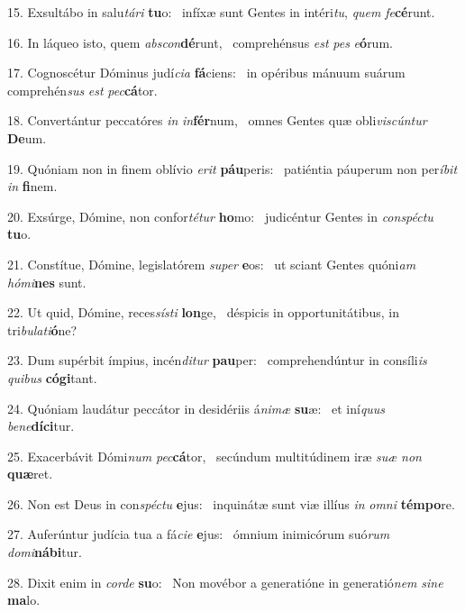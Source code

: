 15. Exsultábo in salu\textit{tá}\textit{ri} \textbf{tu}o: \ast\  infíxæ sunt Gentes in intéri\textit{tu}, \textit{quem} \textit{fe}\textbf{cé}runt.\

16. In láqueo isto, quem \textit{abs}\textit{con}\textbf{dé}runt, \ast\  comprehénsus \textit{est} \textit{pes} \textit{e}\textbf{ó}rum.\

17. Cognoscétur Dóminus judí\textit{ci}\textit{a} \textbf{fá}ciens: \ast\  in opéribus mánuum suárum comprehén\textit{sus} \textit{est} \textit{pec}\textbf{cá}tor.\

18. Convertántur peccatóres \textit{in} \textit{in}\textbf{fér}num, \ast\  omnes Gentes quæ obli\textit{vis}\textit{cún}\textit{tur} \textbf{De}um.\

19. Quóniam non in finem oblívio \textit{e}\textit{rit} \textbf{páu}peris: \ast\  patiéntia páuperum non per\textit{í}\textit{bit} \textit{in} \textbf{fi}nem.\

20. Exsúrge, Dómine, non confor\textit{té}\textit{tur} \textbf{ho}mo: \ast\  judicéntur Gentes in \textit{con}\textit{spéc}\textit{tu} \textbf{tu}o.\

21. Constítue, Dómine, legislatórem \textit{su}\textit{per} \textbf{e}os: \ast\  ut sciant Gentes quóni\textit{am} \textit{hó}\textit{mi}\textbf{nes} sunt.\

22. Ut quid, Dómine, reces\textit{sís}\textit{ti} \textbf{lon}ge, \ast\  déspicis in opportunitátibus, in tri\textit{bu}\textit{la}\textit{ti}\textbf{ó}ne?\

23. Dum supérbit ímpius, incén\textit{di}\textit{tur} \textbf{pau}per: \ast\  comprehendúntur in consíli\textit{is} \textit{qui}\textit{bus} \textbf{có}\textbf{gi}tant.\

24. Quóniam laudátur peccátor in desidériis á\textit{ni}\textit{mæ} \textbf{su}æ: \ast\  et iní\textit{quus} \textit{be}\textit{ne}\textbf{dí}\textbf{ci}tur.\

25. Exacerbávit Dómi\textit{num} \textit{pec}\textbf{cá}tor, \ast\  secúndum multitúdinem iræ \textit{su}\textit{æ} \textit{non} \textbf{quæ}ret.\

26. Non est Deus in con\textit{spéc}\textit{tu} \textbf{e}jus: \ast\  inquinátæ sunt viæ illíus \textit{in} \textit{om}\textit{ni} \textbf{tém}\textbf{po}re.\

27. Auferúntur judícia tua a fá\textit{ci}\textit{e} \textbf{e}jus: \ast\  ómnium inimicórum suó\textit{rum} \textit{do}\textit{mi}\textbf{ná}\textbf{bi}tur.\

28. Dixit enim in \textit{cor}\textit{de} \textbf{su}o: \ast\  Non movébor a generatióne in generatió\textit{nem} \textit{si}\textit{ne} \textbf{ma}lo.\

